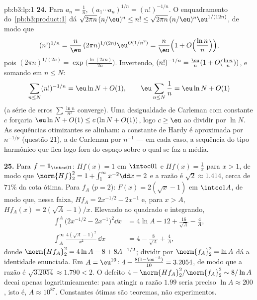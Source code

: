 \begin{solution}{pb:b3:lp:1}
\textbf{24.} Para $a_n = \frac1n$, $(a_1\cdots a_n)^{1/n} =
(n!)^{-1/n}$. O enquadramento do~\cref{pb:b3:product:1} dá
$\sqrt{2\pi n}\,(n/\eu)^n \leq n! \leq \sqrt{2\pi
n}\,(n/\eu)^n\eu^{1/(12n)}$, de modo que
\[
(n!)^{1/n} = \frac n\eu\,(2\pi n)^{1/(2n)}
\eu^{O(1/n^2)}
= \frac n\eu\Bigl(1 +
O\Bigl(\frac{\ln n}{n}\Bigr)\Bigr),
\]
pois $(2\pi n)^{1/(2n)} = \exp\bigl(\frac{\ln(2\pi
n)}{2n}\bigr)$. Invertendo, $(n!)^{-1/n} = \frac\eu n(1 +
O(\frac{\ln n}n))$, e somando em $n \leq N$:
\[
\sum_{n\leq N}(n!)^{-1/n}
= \eu\ln N + O(1),
\qquad
\eu\sum_{n\leq N}\frac1n = \eu\ln N + O(1)
\]
(a série de erros $\sum\frac{\ln n}{n^2}$ converge). Uma
desigualdade de Carleman com constante $c$ forçaria $\eu\ln N
+ O(1) \leq c\,(\ln N + O(1))$, logo $c \geq \eu$ ao
dividir por $\ln N$. As sequências otimizantes se alinham:
a constante de Hardy é aproximada por $n^{-1/p}$ (questão 21),
a de Carleman por $n^{-1}$ --- em cada caso, a sequência do tipo
harmônico que fica logo fora do espaço sobre o qual se faz a média.

\textbf{25.} Para $f = \mathbf 1_{\intcc01}$: $Hf(x) = 1$ em
$\intoc01$ e $Hf(x) = \frac1x$ para $x > 1$, de modo que
$\norm{Hf}_2^2 = 1 + \int_1^\infty x^{-2}\dd x = 2$ e a
razão é $\sqrt2 \approx 1.414$, cerca de $71\%$ da cota
ótima. Para $f_A$ ($p = 2$): $F(x) = 2(\sqrt x - 1)$ em
$\intcc1A$, de modo que, nessa faixa, $Hf_A = 2x^{-1/2} - 2x^{-1}$
e, para $x > A$, $Hf_A(x) = 2(\sqrt A - 1)/x$. Elevando ao quadrado
e integrando,
\begin{align*}
\int_1^A\bigl(2x^{-1/2} - 2x^{-1}\bigr)^2\dd x
&= 4\ln A - 12 + \frac{16}{\sqrt A} - \frac4A,\\
\int_A^{\infty}\frac{4(\sqrt A - 1)^2}{x^2}\,\dd x
&= 4 - \frac{8}{\sqrt A} + \frac4A,
\end{align*}
donde $\norm{Hf_A}_2^2 = 4\ln A - 8 + 8A^{-1/2}$; dividir
por $\norm{f_A}_2^2 = \ln A$ dá a identidade enunciada. Em $A
= \eu^{10}$: $4 - \frac{8(1 - \eu^{-5})}{10} = 3.2054$, de modo que
a razão é $\sqrt{3.2054} \approx 1.790 < 2$. O defeito
$4 - \norm{Hf_A}_2^2/\norm{f_A}_2^2 \sim 8/\ln A$ decai
apenas logaritmicamente: para atingir a razão $1.99$ seria preciso
$\ln A \approx 200$, isto é, $A \approx 10^{87}$. Constantes
ótimas são teoremas, não experimentos.
\end{solution}
